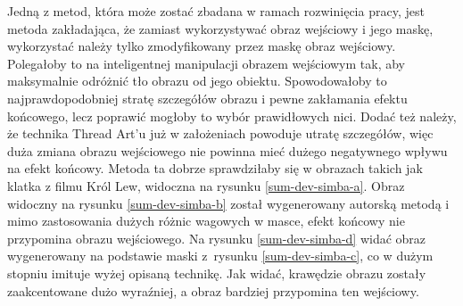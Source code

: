    Jedną z metod, która może zostać zbadana w ramach rozwinięcia pracy, jest metoda zakładająca, że zamiast wykorzystywać obraz wejściowy i jego maskę, wykorzystać należy tylko zmodyfikowany przez maskę obraz wejściowy. Polegałoby to na inteligentnej manipulacji obrazem wejściowym tak, aby maksymalnie odróżnić tło obrazu od jego obiektu. Spowodowałoby to najprawdopodobniej stratę szczegółów obrazu i pewne zakłamania efektu końcowego, lecz poprawić mogłoby to wybór prawidłowych nici. Dodać też należy, że technika Thread Art'u już w założeniach powoduje utratę szczegółów, więc duża zmiana obrazu wejściowego nie powinna mieć dużego negatywnego wpływu na efekt końcowy. Metoda ta dobrze sprawdziłaby się w obrazach takich jak klatka z filmu Król Lew, widoczna na rysunku \ref{sum-dev-simba-a}. Obraz widoczny na rysunku \ref{sum-dev-simba-b} został wygenerowany autorską metodą i mimo zastosowania dużych różnic wagowych w masce, efekt końcowy nie przypomina obrazu wejściowego. Na rysunku \ref{sum-dev-simba-d} widać obraz wygenerowany na podstawie maski z~rysunku \ref{sum-dev-simba-c}, co w dużym stopniu imituje wyżej opisaną technikę. Jak widać, krawędzie obrazu zostały zaakcentowane dużo wyraźniej, a obraz bardziej przypomina ten wejściowy.
